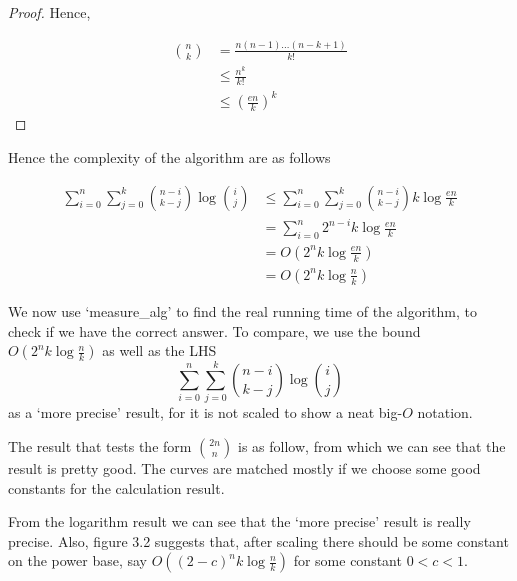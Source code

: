\documentclass[11pt,a4paper,oneside]{article}
\begin{document}
\begin{problem}{3}
\begin{lemma}
\begin{proof}
		Hence,
		
		\[
			\begin{split}
				{n \choose k} &= \frac{n(n-1)\dots(n-k+1)}{k!} \\
				&\leq \frac{n^k}{k!} \\
				&\leq (\frac{en}{k})^k
			\end{split}
		\]
		
    \end{proof}
    \end{lemma}
    Hence the complexity of the algorithm are as follows

    \[
	    \begin{split}
		    \sum_{i = 0}^{n} \sum_{j = 0}^{k} {n - i \choose k - j} \log{i \choose j}  &\leq \sum_{i = 0}^{n} \sum_{j = 0}^{k}  {n - i \choose k - j} k\log{\frac{en}{k}} \\
		    &= \sum_{i=0}^n 2^{n-i} k \log{\frac{en}{k}} \\
		    &= O(2^{n}k \log{\frac{en}{k}}) \\
		    &= O(2^{n}k \log{\frac{n}{k}})
	    \end{split}
	\]
	
	We now use `measure\_alg' to find the real running time of the algorithm, to check if we have the correct answer. To compare, we use the bound $O(2^{n}k \log{\frac{n}{k}})$ as well as the LHS $$
	\sum_{i = 0}^{n} \sum_{j = 0}^{k} {n - i \choose k - j} \log{i \choose j} 
	$$ as a `more precise' result, for it is not scaled to show a neat big-$O$ notation.

	The result that tests the form ${2n \choose n}$ is as follow, from which we can see that the result is pretty good. The curves are matched mostly if we choose some good constants for the calculation result.

	From the logarithm result we can see that the `more precise' result is really precise. Also, figure 3.2 suggests that, after scaling there should be some constant on the power base, say $O((2-c)^{n}k \log{\frac{n}{k}})$ for some constant $0<c<1$.
	\begin{table}[htbp]
		\centering
		

\end{table}
\end{problem}
\end{document}
